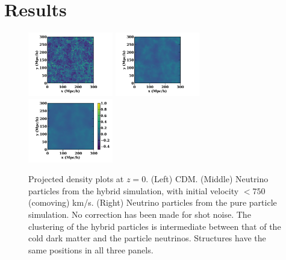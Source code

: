 \documentclass[useAMS, usenatbib]{mnras}
\begin{document}
\section{Results}
\label{sec:results}

\begin{figure}
\includegraphics[trim={1.5cm 0 1.5cm 0},clip,width=0.33\textwidth]{nuplots/dens-plt-b300p512nu0_4hybt1.pdf}
\includegraphics[trim={1.5cm 0 1.5cm 0},clip, width=0.33\textwidth]{nuplots/dens-plt-b300p512nu0_4hybt2.pdf}
\includegraphics[trim={1.5cm 0 1.5cm 0},clip, width=0.33\textwidth]{nuplots/dens-plt-b300p512nu0_4pt2.pdf}
  \caption{Projected density plots at $z=0$. (Left) CDM. (Middle) Neutrino particles from the hybrid simulation, with initial velocity $<750$ (comoving) km/s. (Right) Neutrino particles from the pure particle simulation. No correction has been made for shot noise. The clustering of the hybrid particles is intermediate between that of the cold dark matter and the particle neutrinos. Structures have the same positions in all three panels.}
  \label{fig:density_plot}
\end{figure}
\end{document}
